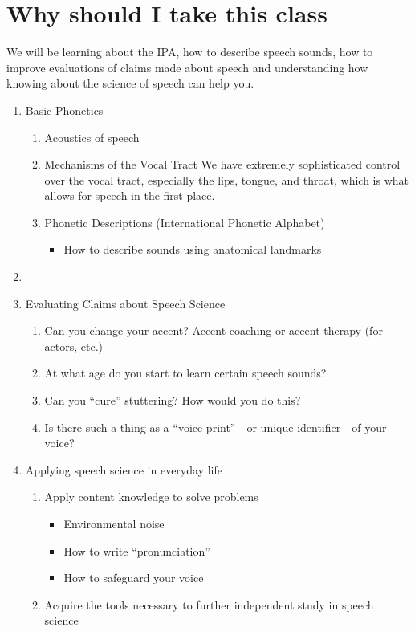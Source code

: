 \documentclass[12pt]{article}
\begin{document}
\section{Why should I take this class}

We will be learning about the IPA, how to describe speech sounds, how to improve
evaluations of claims made about speech and understanding how knowing about the 
science of speech can help you.

\begin{enumerate}
  \item Basic Phonetics
    \begin{enumerate}
      \item Acoustics of speech
      \item Mechanisms of the Vocal Tract
        We have extremely sophisticated control over the vocal tract, especially
        the lips, tongue, and throat, which is what allows for speech in the
        first place.
      \item Phonetic Descriptions (International Phonetic Alphabet)
        \begin{itemize}
          \item How to describe sounds using anatomical landmarks
        \end{itemize}
    \end{enumerate}
  \item 
  \item Evaluating Claims about Speech Science
    \begin{enumerate}
      \item Can you change your accent?
        Accent coaching or accent therapy (for actors, etc.)
      \item At what age do you start to learn certain speech sounds?
      \item Can you \enquote{cure} stuttering? How would you do this?
      \item Is there such a thing as a \enquote{voice print} - or unique
        identifier - of your voice?
    \end{enumerate}
  \item Applying speech science in everyday life
    \begin{enumerate}
      \item Apply content knowledge to solve problems
        \begin{itemize}
          \item Environmental noise
          \item How to write \enquote{pronunciation}
          \item How to safeguard your voice
        \end{itemize}
      \item Acquire the tools necessary to further independent study in speech
        science
    \end{enumerate}
\end{enumerate}
\end{document}
